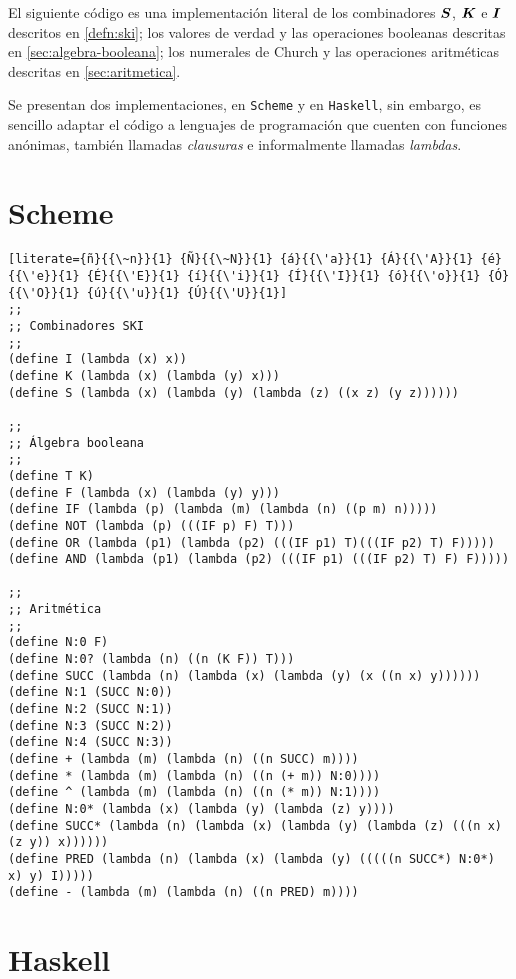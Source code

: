 El siguiente código es una implementación literal de los combinadores \( \boldsymbol{S} \), \( \boldsymbol{K} \) e \( \boldsymbol{I} \) descritos en \ref{defn:ski}; los valores de verdad y las operaciones booleanas descritas en \ref{sec:algebra-booleana}; los numerales de Church y las operaciones aritméticas descritas en \ref{sec:aritmetica}.

Se presentan dos implementaciones, en \texttt{Scheme} y en \texttt{Haskell}, sin embargo, es sencillo adaptar el código a lenguajes de programación que cuenten con funciones anónimas, también llamadas \emph{clausuras} e informalmente llamadas \emph{lambdas}.

\section{Scheme}
\label{ap:1:scheme}

\begin{lstlisting}[literate={ñ}{{\~n}}{1} {Ñ}{{\~N}}{1} {á}{{\'a}}{1} {Á}{{\'A}}{1} {é}{{\'e}}{1} {É}{{\'E}}{1} {í}{{\'i}}{1} {Í}{{\'I}}{1} {ó}{{\'o}}{1} {Ó}{{\'O}}{1} {ú}{{\'u}}{1} {Ú}{{\'U}}{1}]
;; 
;; Combinadores SKI
;;
(define I (lambda (x) x))
(define K (lambda (x) (lambda (y) x)))
(define S (lambda (x) (lambda (y) (lambda (z) ((x z) (y z))))))

;; 
;; Álgebra booleana
;;
(define T K)
(define F (lambda (x) (lambda (y) y)))
(define IF (lambda (p) (lambda (m) (lambda (n) ((p m) n)))))
(define NOT (lambda (p) (((IF p) F) T)))
(define OR (lambda (p1) (lambda (p2) (((IF p1) T)(((IF p2) T) F)))))
(define AND (lambda (p1) (lambda (p2) (((IF p1) (((IF p2) T) F) F)))))

;; 
;; Aritmética
;; 
(define N:0 F)
(define N:0? (lambda (n) ((n (K F)) T)))
(define SUCC (lambda (n) (lambda (x) (lambda (y) (x ((n x) y))))))
(define N:1 (SUCC N:0))
(define N:2 (SUCC N:1))
(define N:3 (SUCC N:2))
(define N:4 (SUCC N:3))
(define + (lambda (m) (lambda (n) ((n SUCC) m))))
(define * (lambda (m) (lambda (n) ((n (+ m)) N:0))))
(define ^ (lambda (m) (lambda (n) ((n (* m)) N:1))))
(define N:0* (lambda (x) (lambda (y) (lambda (z) y))))
(define SUCC* (lambda (n) (lambda (x) (lambda (y) (lambda (z) (((n x) (z y)) x))))))
(define PRED (lambda (n) (lambda (x) (lambda (y) (((((n SUCC*) N:0*) x) y) I)))))
(define - (lambda (m) (lambda (n) ((n PRED) m))))
\end{lstlisting}

\section{Haskell}
\label{ap:1:haskell}

